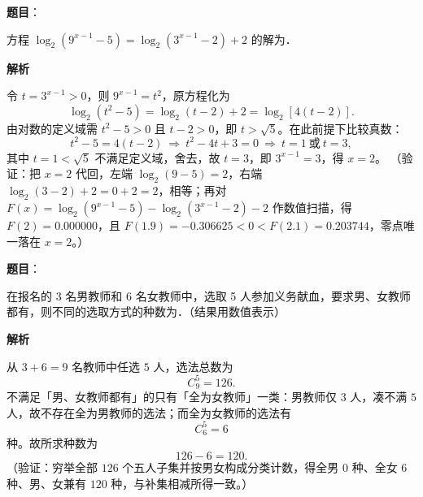 \begin{answer}

\textbf{题目}：

方程 \(\log_{2}(9^{x-1}-5)=\log_{2}(3^{x-1}-2)+2\) 的解为\gkblank{}．

\textbf{解析}

令 \(t=3^{x-1}>0\)，则 \(9^{x-1}=t^{2}\)，原方程化为
\nopagebreak[4]
\[
\log_{2}(t^{2}-5)=\log_{2}(t-2)+2=\log_{2}\left[4(t-2)\right].
\]
由对数的定义域需 \(t^{2}-5>0\) 且 \(t-2>0\)，即 \(t>\sqrt{5}\)。在此前提下比较真数：
\nopagebreak[4]
\[
t^{2}-5=4(t-2)\ \Longrightarrow\ t^{2}-4t+3=0\ \Longrightarrow\ t=1\ \text{或}\ t=3,
\]
其中 \(t=1<\sqrt{5}\) 不满足定义域，舍去，故 \(t=3\)，即 \(3^{x-1}=3\)，得 \(x=2\)。
（验证：把 \(x=2\) 代回，左端 \(\log_{2}(9-5)=2\)，右端 \(\log_{2}(3-2)+2=0+2=2\)，相等；再对 \(F(x)=\log_{2}(9^{x-1}-5)-\log_{2}(3^{x-1}-2)-2\) 作数值扫描，得 \(F(2)=0.000000\)，且 \(F(1.9)=-0.306625<0<F(2.1)=0.203744\)，零点唯一落在 \(x=2\)。）


\end{answer}
\begin{answer}

\textbf{题目}：

在报名的 3 名男教师和 6 名女教师中，选取 5 人参加义务献血，要求男、女教师都有，则不同的选取方式的种数为\gkblank{}．（结果用数值表示）

\textbf{解析}

从 \(3+6=9\) 名教师中任选 \(5\) 人，选法总数为
\nopagebreak[4]
\[
C_{9}^{5}=126.
\]
不满足「男、女教师都有」的只有「全为女教师」一类：男教师仅 \(3\) 人，凑不满 \(5\) 人，故不存在全为男教师的选法；而全为女教师的选法有
\nopagebreak[4]
\[
C_{6}^{5}=6
\]
种。故所求种数为
\nopagebreak[4]
\[
126-6=120.
\]
（验证：穷举全部 \(126\) 个五人子集并按男女构成分类计数，得全男 \(0\) 种、全女 \(6\) 种、男、女兼有 \(120\) 种，与补集相减所得一致。）


\end{answer}
